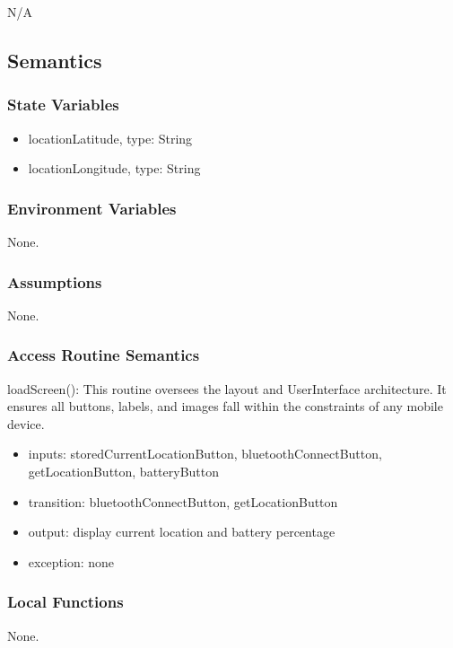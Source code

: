 \documentclass[12pt, titlepage]{article}
\begin{document}
N/A

\subsection{Semantics}

\subsubsection{State Variables}

\begin{itemize}
\item locationLatitude, type: String
\item locationLongitude, type: String
\end{itemize}


\subsubsection{Environment Variables}

None.


\subsubsection{Assumptions}

None.

\subsubsection{Access Routine Semantics}

\noindent loadScreen():
This routine oversees the layout and UserInterface architecture. It ensures all buttons, labels, and images fall within the constraints of any mobile device. 
\begin{itemize}
\item inputs: storedCurrentLocationButton, bluetoothConnectButton, getLocationButton, batteryButton
\item transition: bluetoothConnectButton, getLocationButton
\item output: display current location and battery percentage
\item exception: none
\end{itemize}

\subsubsection{Local Functions}

None.
\end{document}

